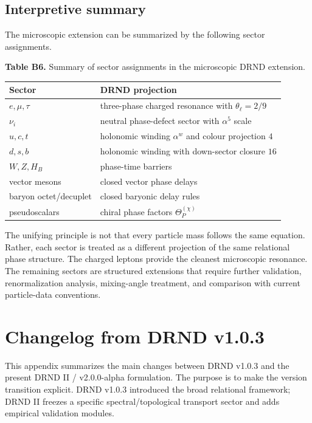 \documentclass[12pt]{iopart}
\begin{document}
\subsection{Interpretive summary}

The microscopic extension can be summarized by the following sector assignments.

\noindent\textbf{Table B6.} Summary of sector assignments in the microscopic DRND extension.

\begin{center}
\small
\begin{tabular}{ll}
\hline
\textbf{Sector} & \textbf{DRND projection} \\
\hline
\(e,\mu,\tau\) & three-phase charged resonance with \(\theta_\ell=2/9\) \\
\(\nu_i\) & neutral phase-defect sector with \(\alpha^5\) scale \\
\(u,c,t\) & holonomic winding \(\alpha^w\) and colour projection \(4\) \\
\(d,s,b\) & holonomic winding with down-sector closure \(16\) \\
\(W,Z,H_B\) & phase-time barriers \\
vector mesons & closed vector phase delays \\
baryon octet/decuplet & closed baryonic delay rules \\
pseudoscalars & chiral phase factors \(\Theta_P^{(\chi)}\) \\
\hline
\end{tabular}
\end{center}

The unifying principle is not that every particle mass follows the same equation. Rather, each sector is treated as a different projection of the same relational phase structure. The charged leptons provide the cleanest microscopic resonance. The remaining sectors are structured extensions that require further validation, renormalization analysis, mixing-angle treatment, and comparison with current particle-data conventions.

\section{Changelog from DRND v1.0.3}
\label{app:changelog}

This appendix summarizes the main changes between DRND v1.0.3 and the present DRND II / v2.0.0-alpha formulation. The purpose is to make the version transition explicit. DRND v1.0.3 introduced the broad relational framework; DRND II freezes a specific spectral/topological transport sector and adds empirical validation modules.
\end{document}
